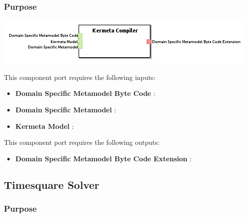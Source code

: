 \documentclass{gemoc} %
\begin{document}

\subsubsection{Purpose}

\begin{center}
\includegraphics*[trim=0.0cm 0.0cm 0cm 0.0cm, clip=true]{../images/generated/Generated_Kermeta_Compiler.png}
\end{center}

This component port requires the following inputs:
\begin{itemize}
  \item \textbf{Domain Specific Metamodel Byte Code} :
  \item \textbf{Domain Specific Metamodel} :
  \item \textbf{Kermeta Model} :
\end{itemize}

This component port requires the following outputs:
\begin{itemize}
  \item \textbf{Domain Specific Metamodel Byte Code Extension} :
\end{itemize}

\subsection{Timesquare Solver}


\subsubsection{Purpose}
\end{document}
